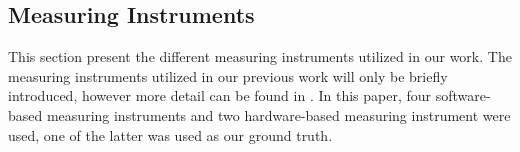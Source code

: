 \subsection{Measuring Instruments}\label{subsec:measuring_instruments}
This section present the different measuring instruments utilized in our work. The measuring instruments utilized in our previous work will only be briefly introduced, however more detail can be found in \cite{biksbois}. In this paper, four software-based measuring instruments and two hardware-based measuring instrument were used, one of the latter was used as our ground truth.


